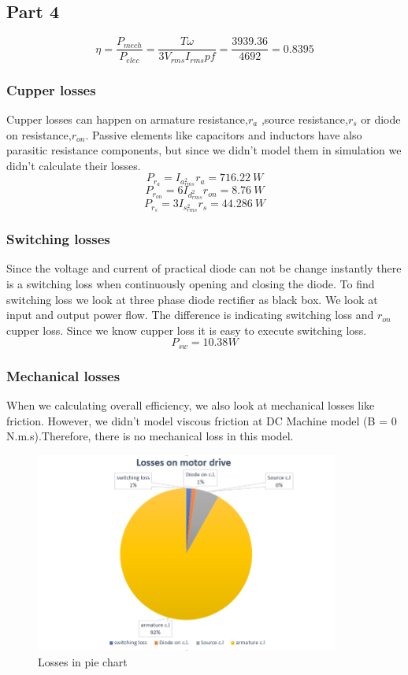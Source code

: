 \documentclass[fleqn, a4paper]{report}
\begin{document}
\subsection*{Part 4}
$$\eta = \frac{P_{mech}}{P_{elec}}=\frac{T \omega}{3 V_{rms} I_{rms} pf} = \frac{3939.36}{4692} = 0.8395 $$
\subsubsection*{Cupper losses}
Cupper losses can happen on armature resistance,$r_a$ ,source resistance,$r_s$ or diode on resistance,$r_{on}$. Passive elements like capacitors and inductors have also parasitic resistance components, but since we didn't model them in simulation we didn't calculate their losses. 
$$P_{r_a}=I_a_{rms}^2 r_a=716.22 \>W$$
$$P_{r_{on}}=6 I_d_{rms}^2 r_{on} = 8.76 \>W$$
$$P_{r_s}=3 I_s_{rms}^2 r_s = 44.286 \> W$$

\subsubsection*{Switching losses}
Since the voltage and current of practical diode can not be change instantly there is a switching loss when continuously opening and closing the diode. To find switching loss we look at three phase diode rectifier as black box. We look at input and output power flow. The difference is indicating switching loss and $r_{on}$ cupper loss. Since we know cupper loss it is easy to execute switching loss. 
$$P_{sw} = 10.38 W$$
\subsubsection*{Mechanical losses}
When we calculating overall efficiency, we also look at mechanical losses like friction. However, we didn't model viscous friction at DC Machine model (B = 0 N.m.s).Therefore, there is no mechanical loss in this model. 
\begin{figure}[H]
    \centering
    \includegraphics[width=10cm]{losses.PNG}
    \caption{Losses in pie chart}
    \label{fig:my_label}
\end{figure}
\end{document}
